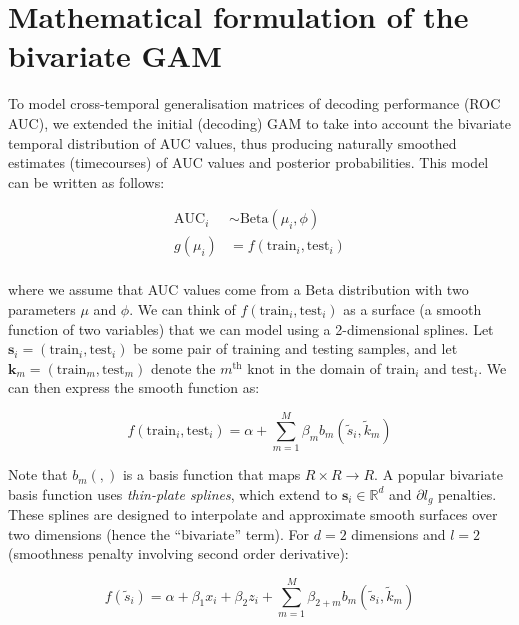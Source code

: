 \documentclass[
  doc,
  floatsintext,
  longtable,
  a4paper,
  nolmodern,
  notxfonts,
  notimes,
  colorlinks=true,linkcolor=blue,citecolor=blue,urlcolor=blue]{apa7}
\begin{document}
\newpage

\section{Mathematical formulation of the bivariate
GAM}\label{mathematical-formulation-of-the-bivariate-gam}

To model cross-temporal generalisation matrices of decoding performance
(ROC AUC), we extended the initial (decoding) GAM to take into account
the bivariate temporal distribution of AUC values, thus producing
naturally smoothed estimates (timecourses) of AUC values and posterior
probabilities. This model can be written as follows:

\[
\begin{aligned}
\text{AUC}_{i} &\sim \mathrm{Beta}(\mu_{i}, \phi)\\
g(\mu_{i}) &= f \left(\text{train}_{i}, \text{test}_{i} \right)\\
\end{aligned}
\]

where we assume that AUC values come from a \(\mathrm{Beta}\)
distribution with two parameters \(\mu\) and \(\phi\). We can think of
\(f \left(\text{train}_{i}, \text{test}_{i} \right)\) as a surface (a
smooth function of two variables) that we can model using a
2-dimensional splines. Let
\(\mathbf{s}_{i} = \left(\text{train}_{i}, \text{test}_{i} \right)\) be
some pair of training and testing samples, and let
\(\mathbf{k}_{m} = \left(\text{train}_{m}, \text{test}_{m} \right)\)
denote the \(m^{\text{th}}\) knot in the domain of \(\text{train}_{i}\)
and \(\text{test}_{i}\). We can then express the smooth function as:

\[
f \left(\text{train}_{i}, \text{test}_{i} \right) = \alpha + \sum_{m=1}^M \beta_{m} b_{m} \left(\tilde{s}_{i}, \tilde{k}_{m} \right)
\]

Note that \(b_{m}(,)\) is a basis function that maps
\(R \times R \rightarrow R\). A popular bivariate basis function uses
\emph{thin-plate splines}, which extend to
\(\mathbf{s}_{i} \in \mathbb{R}^{d}\) and \(\partial l_{g}\) penalties.
These splines are designed to interpolate and approximate smooth
surfaces over two dimensions (hence the ``bivariate'' term). For \(d=2\)
dimensions and \(l=2\) (smoothness penalty involving second order
derivative):

\[
f \left(\tilde{s}_{i} \right) = \alpha + \beta_{1} x_{i} + \beta_{2} z_{i} +\sum_{m=1}^{M} \beta_{2+m} b_m\left(\tilde{s}_i, \tilde{k}_m\right)
\]
\end{document}
